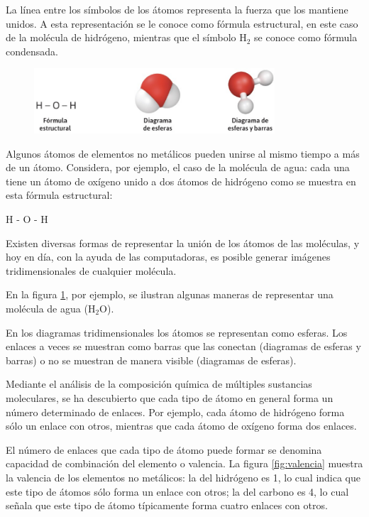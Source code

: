 \documentclass[11pt]{book}
\begin{document}
La línea entre los símbolos de los átomos representa la fuerza que los mantiene unidos.
A esta representación se le conoce como fórmula estructural, en este caso de la molécula
de hidrógeno, mientras que el símbolo H$_2$ se conoce como fórmula condensada.

\begin{figure}[H]
  \centering
  \includegraphics[width=0.8\textwidth]{esferas.jpg}
  \label{fig:esferas}
\end{figure}

Algunos átomos de elementos no metálicos pueden unirse al mismo tiempo a más de un átomo.
Considera, por ejemplo, el caso de la molécula de agua: cada una tiene un átomo de oxígeno
unido a dos átomos de hidrógeno como se muestra en esta fórmula estructural:

\begin{center}
  H - O - H
\end{center}

Existen diversas formas de representar la unión de los átomos de las moléculas, y hoy en día,
con la ayuda de las computadoras, es posible generar imágenes tridimensionales de cualquier
molécula.

En la figura \ref{fig:esferas}, por ejemplo,
se ilustran algunas maneras de representar una molécula de agua (H$_2$O).

En los diagramas tridimensionales los átomos se representan como esferas. Los enlaces a
veces se muestran como barras que las conectan (diagramas de esferas y barras) o no se muestran de manera visible (diagramas de esferas).

Mediante el análisis de la composición química de múltiples sustancias moleculares,
se ha descubierto que cada tipo de átomo en general forma un número determinado de enlaces.
Por ejemplo, cada átomo de hidrógeno forma sólo un enlace con otros, mientras que cada
átomo de oxígeno forma dos enlaces.

El número de enlaces que cada tipo de átomo puede
formar se denomina capacidad de combinación del elemento o valencia. La figura \ref{fig:valencia}
muestra la valencia de los elementos no metálicos: la del hidrógeno es 1, lo cual
indica que este tipo de átomos sólo forma un enlace con otros; la del carbono es 4,
lo cual señala que este tipo de átomo típicamente forma cuatro enlaces con otros.
\end{document}
